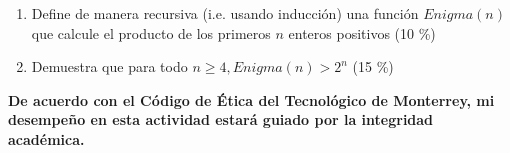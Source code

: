 \documentclass{article}
\begin{document}
\begin{enumerate}[label=\tt \alph*)]
    \item Define de manera recursiva (i.e. usando inducción) una función $Enigma(n)$ que calcule el producto de los primeros $n$ enteros positivos (10 \%)
    \item Demuestra que para todo $n \geq 4, Enigma(n) > 2^n$ (15 \%)
\end{enumerate}

\vfill

\textbf{De acuerdo con el Código de Ética del Tecnológico de Monterrey, mi desempeño en esta actividad estará guiado por la integridad académica.}
\end{document}
